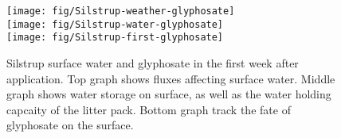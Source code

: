 \begin{figure}[htbp]
  \begin{center}
    \texttt{[image: fig/Silstrup-weather-glyphosate]}\\
    \texttt{[image: fig/Silstrup-water-glyphosate]}\\
    \texttt{[image: fig/Silstrup-first-glyphosate]}
  \end{center}
  \caption{Silstrup surface water and glyphosate in the first week
    after application.  Top graph shows fluxes affecting surface
    water.  Middle graph shows water storage on surface, as well as
    the water holding capcaity of the litter pack.  Bottom graph track
    the fate of glyphosate on the surface.}
  \label{fig:Silstrup-weather-glyphosate}
\end{figure}\FloatBarrier

